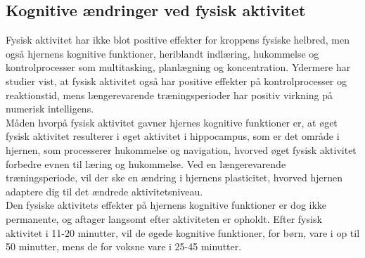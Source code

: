 \subsection{Kognitive ændringer ved fysisk aktivitet}


Fysisk aktivitet har ikke blot positive effekter for kroppens fysiske helbred, men også hjernens kognitive funktioner, heriblandt indlæring, hukommelse og kontrolprocesser som multitasking, planlægning og koncentration\citep{Berchtold2010,Schmidt2015}. Ydermere har studier vist, at fysisk aktivitet også har positive effekter på kontrolprocesser og reaktionstid, mens længerevarende træningsperioder har positiv virkning på numerisk intelligens\citep{Bugge2015,Berchtold2010,Schmidt2015}.\\
Måden hvorpå fysisk aktivitet gavner hjernes kognitive funktioner er, at øget fysisk aktivitet resulterer i øget aktivitet i hippocampus, som er det område i hjernen, som processerer hukommelse og navigation, hvorved øget fysisk aktivitet forbedre evnen til læring og hukommelse. Ved en længerevarende træningsperiode, vil der ske en ændring i hjernens plasticitet, hvorved hjernen adaptere dig til det ændrede aktivitetsniveau.\citep{Cotman2007}\\

Den fysiske aktivitets effekter på hjernens kognitive funktioner er dog ikke permanente, og aftager langsomt efter aktiviteten er opholdt. Efter fysisk aktivitet i 11-20 minutter, vil de øgede kognitive funktioner, for børn, vare i op til 50 minutter, mens de for voksne vare i 25-45 minutter.\citep{Cotman2007}



